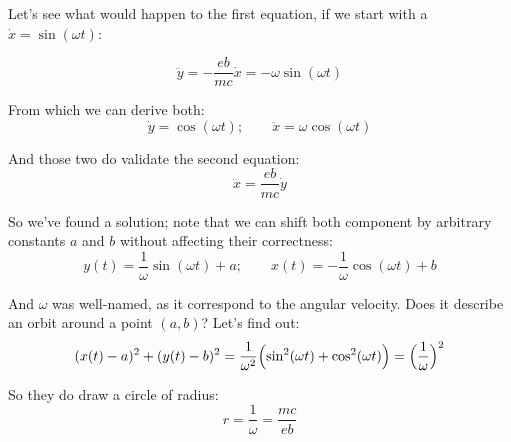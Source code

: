 \documentclass[solutions.tex]{subfiles}
\begin{document}
Let's see what would happen to the first equation, if we start
with a $\dot{x}=\sin(\omega t)$:

\[ \ddot{y} = -\frac{eb}{mc}\dot{x} = -\omega\sin(\omega t) \]

From which we can derive both:
\[
	\dot{y} = \cos(\omega t);\qquad
	\ddot{x} = \omega\cos(\omega t)
\]

And those two do validate the second equation:
\[
	\ddot{x} = \frac{eb}{mc}\dot{y}
\]

So we've found a solution; note that we can shift both
component by arbitrary constants $a$ and $b$ without
affecting their correctness:
\[
	\boxed{
		y(t) = \frac1\omega\sin(\omega t) + a;\qquad
		x(t) = -\frac1\omega\cos(\omega t) + b
	}
\]

And $\omega$ was well-named, as it correspond to the
angular velocity. Does it describe an orbit around a point $(a, b)$?
Let's find out:
\[
	(x(t)-a)^2 + (y(t)-b)^2 =
	\frac1{\omega^2}\Bigl(\sin^2(\omega t)+\cos^2(\omega t)\Bigr)
	= \Bigl(\frac1\omega\Bigr)^2
\]

So they do draw a circle of radius:
\[
	\boxed{r = \frac1\omega = \frac{mc}{eb}}
\]
\end{document}
